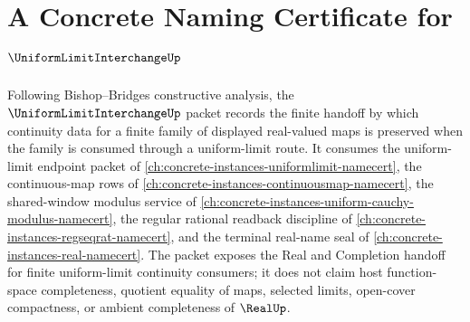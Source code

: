 \chapter{A Concrete Naming Certificate for $\UniformLimitInterchangeUp$}
\label{ch:concrete-instances-uniform-limit-interchange-namecert}

Following Bishop--Bridges constructive analysis, the $\UniformLimitInterchangeUp$ packet records the finite handoff by which continuity data for a finite family of displayed real-valued maps is preserved when the family is consumed through a uniform-limit route. It consumes the uniform-limit endpoint packet of \autoref{ch:concrete-instances-uniformlimit-namecert}, the continuous-map rows of \autoref{ch:concrete-instances-continuousmap-namecert}, the shared-window modulus service of \autoref{ch:concrete-instances-uniform-cauchy-modulus-namecert}, the regular rational readback discipline of \autoref{ch:concrete-instances-regseqrat-namecert}, and the terminal real-name seal of \autoref{ch:concrete-instances-real-namecert}. The packet exposes the Real and Completion handoff for finite uniform-limit continuity consumers; it does not claim host function-space completeness, quotient equality of maps, selected limits, open-cover compactness, or ambient completeness of $\RealUp$.

